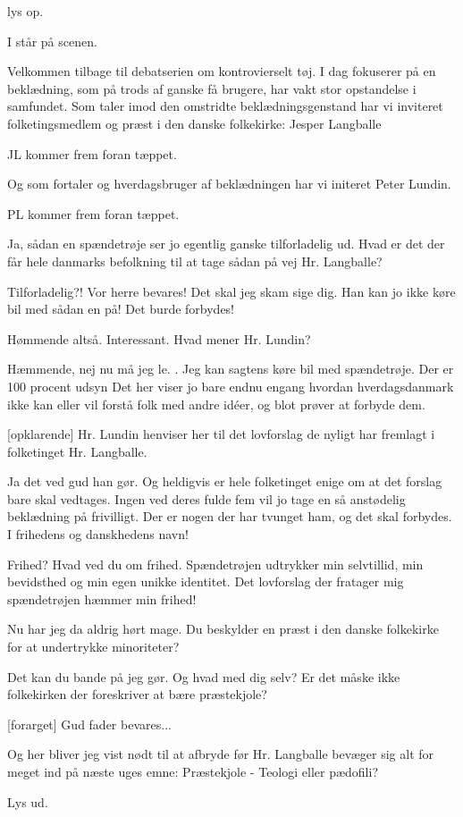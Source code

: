 \documentclass[a4paper,11pt]{article}
\begin{document}
\begin{sketch}

\scene lys op.

\scene I står på scenen.

 Velkommen tilbage til debatserien om kontrovierselt tøj.
 I dag fokuserer på en beklædning, som på trods af ganske få brugere, har vakt stor opstandelse i samfundet.
 Som taler imod den omstridte beklædningsgenstand har vi inviteret folketingsmedlem og præst i den danske folkekirke: Jesper Langballe

\scene JL kommer frem foran tæppet.

 Og som fortaler og hverdagsbruger af beklædningen har vi initeret Peter Lundin.

\scene PL kommer frem foran tæppet.

 Ja, sådan en spændetrøje ser jo egentlig ganske tilforladelig ud. Hvad er det der får hele danmarks befolkning til at tage sådan på vej Hr. Langballe?

 Tilforladelig?! Vor herre bevares! Det skal jeg skam sige dig. Han kan jo ikke køre bil med sådan en på! Det burde forbydes!

 Hømmende altså. Interessant. Hvad mener Hr. Lundin?

 Hæmmende, nej nu må jeg le. . Jeg kan sagtens køre bil med spændetrøje. Der er 100 procent udsyn
 Det her viser jo bare endnu engang hvordan hverdagsdanmark ikke kan eller vil forstå folk med andre idéer, og blot prøver at forbyde dem.

[opklarende] Hr. Lundin henviser her til det lovforslag de nyligt har fremlagt i folketinget Hr. Langballe.

 Ja det ved gud han gør. Og heldigvis er hele folketinget enige om at det forslag bare skal vedtages.
 Ingen ved deres fulde fem vil jo tage en så anstødelig beklædning på frivilligt. Der er nogen der har tvunget ham, og det skal forbydes. I frihedens og danskhedens navn!

 Frihed? Hvad ved du om frihed. Spændetrøjen udtrykker min selvtillid, min bevidsthed og min egen unikke identitet.
 Det lovforslag der fratager mig spændetrøjen hæmmer min frihed! 

 Nu har jeg da aldrig hørt mage. Du beskylder en præst i den danske folkekirke for at undertrykke minoriteter?

 Det kan du bande på jeg gør. Og hvad med dig selv? Er det måske ikke folkekirken der foreskriver at bære præstekjole?

[forarget]  Gud fader bevares...

 Og her bliver jeg vist nødt til at afbryde før Hr. Langballe bevæger sig alt for meget ind på næste uges emne: Præstekjole - Teologi eller pædofili?

\scene Lys ud.

\end{sketch}
\end{document}
